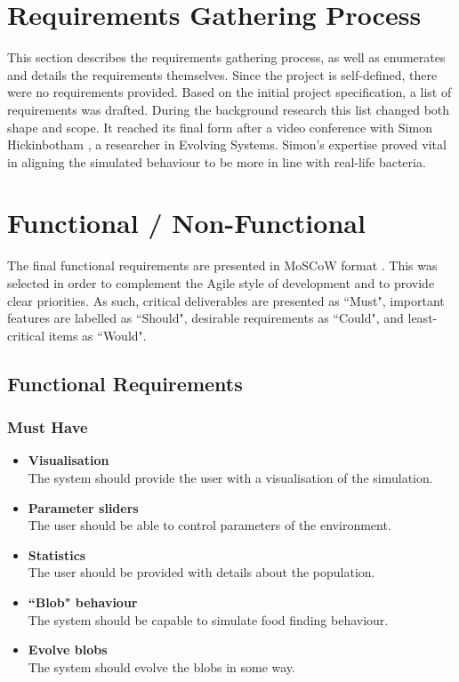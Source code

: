 \section{Requirements Gathering Process}
This section describes the requirements gathering process, as well as enumerates and details the requirements themselves. Since the project is self-defined, there were no requirements provided.
Based on the initial project specification, a list of requirements was drafted. During the background research this list changed both shape and scope. It reached its final form after a video conference with Simon Hickinbotham \cite{simonyork}, a researcher in Evolving Systems. Simon's expertise proved vital in aligning the simulated behaviour to be more in line with real-life bacteria.

\section{Functional / Non-Functional}
The final functional requirements are presented in MoSCoW format \cite{brennan2009guide}. This was selected in order to complement the Agile style of development and to provide clear priorities. As such, critical deliverables are presented as ``Must", important features are labelled as ``Should", desirable requirements as ``Could", and least-critical items as ``Would".
\subsection{Functional Requirements}

\subsubsection{Must Have}
\begin{itemize}
	\item \textbf{Visualisation} \\The system should provide the user with a visualisation of the simulation.
	\item \textbf{Parameter sliders} \\The user should be able to control parameters of the environment.
	\item \textbf{Statistics} \\The user should be provided with details about the population.
	\item \textbf{``Blob" behaviour} \\The system should be capable to simulate food finding behaviour.
	\item \textbf{Evolve blobs} \\The system should evolve the blobs in some way.
\end{itemize}

